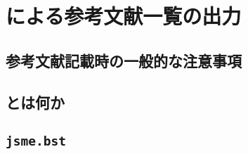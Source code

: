 \chapter{\BibTeX による参考文献一覧の出力}
\label{ch:bibtex}


\section{参考文献記載時の一般的な注意事項}
\label{sec:bibcaution}


\section{\BibTeX とは何か}
\label{sec:whatisbibtex}


\section{\texttt{jsme.bst}}
\label{sec:jsme-bst}


